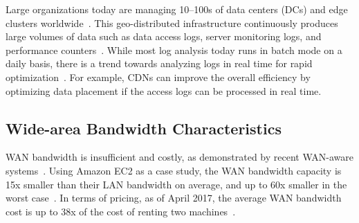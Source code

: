 
 Large organizations today are managing
10--100s of data centers (DCs) and edge clusters
worldwide~\cite{calder2013mapping}. This geo-distributed infrastructure
continuously produces large volumes of data such as data access logs, server
monitoring logs, and performance counters~\cite{pu2015low,
  alspaugh2014analyzing, vulimiri2015global}. While most log analysis today runs
in batch mode on a daily basis, there is a trend towards analyzing logs in
real time for rapid optimization~\cite{rabkin2014aggregation}. For example, CDNs can improve the overall efficiency by optimizing data placement if the access logs can be processed in real time.



\subsection{Wide-area Bandwidth Characteristics}
\label{sec:wide-area-bandwidth}

WAN bandwidth is insufficient and costly, as demonstrated by recent WAN-aware
systems~\cite{pu2015low, vulimiri2015global, vulimiri2015wananlytics,
  hsieh17gaia}. Using Amazon EC2 as a case study, the WAN bandwidth capacity is
15x smaller than their LAN bandwidth on average, and up to 60x smaller in the
worst case~\cite{hsieh17gaia}. In terms of pricing, as of April 2017, the
average WAN bandwidth cost is up to 38x of the cost of renting two
machines~\cite{amazon2017pricing}.

